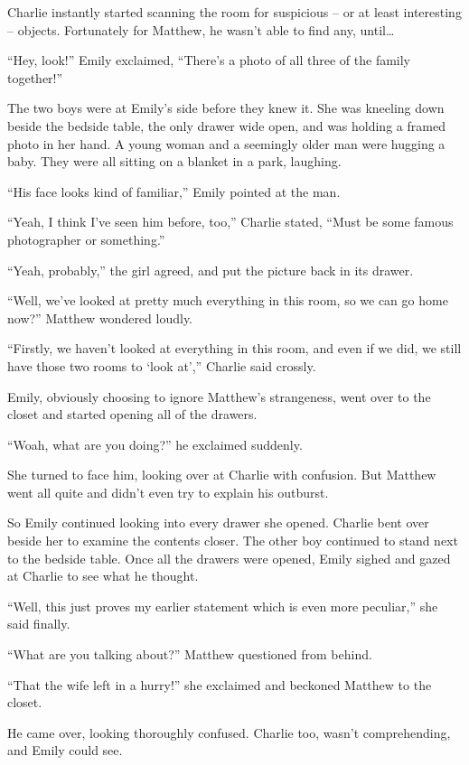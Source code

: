Charlie instantly started scanning the room for suspicious – or at least interesting – objects. Fortunately for Matthew, he wasn't able to find any, until…

“Hey, look!” Emily exclaimed, “There's a photo of all three of the family together!”

The two boys were at Emily's side before they knew it. She was kneeling down beside the bedside table, the only drawer wide open, and was holding a framed photo in her hand. A young woman and a seemingly older man were hugging a baby. They were all sitting on a blanket in a park, laughing.

“His face looks kind of familiar,” Emily pointed at the man.

“Yeah, I think I've seen him before, too,” Charlie stated, “Must be some famous photographer or something.”

“Yeah, probably,” the girl agreed, and put the picture back in its drawer.

“Well, we've looked at pretty much everything in this room, so we can go home now?” Matthew wondered loudly.

“Firstly, we haven't looked at everything in this room, and even if we did, we still have those two rooms to ‘look at',” Charlie said crossly.

Emily, obviously choosing to ignore Matthew's strangeness, went over to the closet and started opening all of the drawers.

“Woah, what are you doing?” he exclaimed suddenly.

She turned to face him, looking over at Charlie with confusion. But Matthew went all quite and didn't even try to explain his outburst.

So Emily continued looking into every drawer she opened. Charlie bent over beside her to examine the contents closer. The other boy continued to stand next to the bedside table. Once all the drawers were opened, Emily sighed and gazed at Charlie to see what he thought.

“Well, this just proves my earlier statement which is even more peculiar,” she said finally.

“What are you talking about?” Matthew questioned from behind.

“That the wife left in a hurry!” she exclaimed and beckoned Matthew to the closet.

He came over, looking thoroughly confused. Charlie too, wasn't comprehending, and Emily could see.

